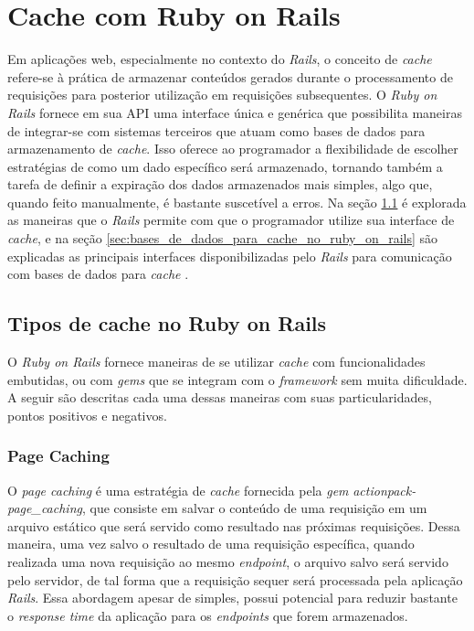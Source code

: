 \section{Cache com Ruby on Rails}

Em aplicações web, especialmente no contexto do \textit{Rails}, o conceito de \textit{cache} refere-se à prática de armazenar conteúdos gerados durante o processamento de requisições para posterior utilização em requisições subsequentes. O \textit{Ruby on Rails} fornece em sua API uma interface única e genérica que possibilita maneiras de integrar-se com sistemas terceiros que atuam como bases de dados para armazenamento de \textit{cache}. Isso oferece ao programador a flexibilidade de escolher estratégias de como um dado específico será armazenado, tornando também a tarefa de definir a expiração dos dados armazenados mais simples, algo que, quando feito manualmente, é bastante suscetível a erros. Na seção \ref{sec:tipos_de_cache_no_ruby_on_rails} é explorada as maneiras que o \textit{Rails} permite com que o programador utilize sua interface de \textit{cache}, e na seção \ref{sec:bases_de_dados_para_cache_no_ruby_on_rails} são explicadas as principais interfaces disponibilizadas pelo \textit{Rails} para comunicação com bases de dados para \textit{cache} \cite{caching-with-rails-overview}.

\subsection{Tipos de cache no Ruby on Rails}
\label{sec:tipos_de_cache_no_ruby_on_rails}

O \textit{Ruby on Rails} fornece maneiras de se utilizar \textit{cache} com funcionalidades embutidas, ou com \textit{gems} que se integram com o \textit{framework} sem muita dificuldade. A seguir são descritas cada uma dessas maneiras com suas particularidades, pontos positivos e negativos.

\subsubsection{Page Caching}

O \textit{page caching} é uma estratégia de \textit{cache} fornecida pela \textit{gem}  \textit{actionpack-page\_caching}, que consiste em salvar o conteúdo de uma requisição em um arquivo estático que será servido como resultado nas próximas requisições. Dessa maneira, uma vez salvo o resultado de uma requisição específica, quando realizada uma nova requisição ao mesmo \textit{endpoint}, o arquivo salvo será servido pelo servidor, de tal forma que a requisição sequer será processada pela aplicação \textit{Rails}. Essa abordagem apesar de simples, possui potencial para reduzir bastante o \textit{response time} da aplicação para os \textit{endpoints} que forem armazenados.

